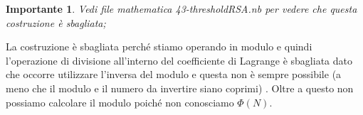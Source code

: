 \documentclass{book}
\newtheorem*{Importante}{\textbf{Importante}}
\begin{document}
\begin{Importante}
    Vedi file mathematica 43-thresholdRSA.nb per vedere che questa costruzione è sbagliata;
\end{Importante}
La costruzione è sbagliata perché stiamo operando in modulo e quindi l'operazione di divisione all'interno del coefficiente di Lagrange è sbagliata dato che occorre utilizzare l'inversa del modulo e questa non è sempre possibile (a meno che il modulo e il numero da invertire siano coprimi) \@. Oltre a questo non possiamo calcolare il modulo poiché non conosciamo \(\Phi(N)\).
\end{document}
